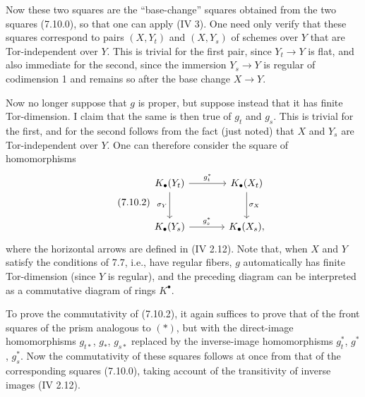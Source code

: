 %

Now these two squares are the ``base-change'' squares obtained from the two squares (7.10.0), so that one can apply (IV 3). One need only verify that these squares correspond to pairs \((X,Y_t)\) and \((X,Y_s)\) of schemes over \(Y\) that are Tor-independent over \(Y\). This is trivial for the first pair, since \(Y_t\to Y\) is flat, and also immediate for the second, since the immersion \(Y_s\to Y\) is regular of codimension 1 and remains so after the base change \(X\to Y\).

Now no longer suppose that \(g\) is proper, but suppose instead that it has finite Tor-dimension. I claim that the same is then true of \(g_t\) and \(g_s\). This is trivial for the first, and for the second follows from the fact (just noted) that \(X\) and \(Y_s\) are Tor-independent over \(Y\). One can therefore consider the square of homomorphisms
\begin{equation}\tag{7.10.2}
\begin{tikzcd}[column sep=large,row sep=large]
K_\bullet(Y_t) \arrow[r,"g_t^*"] \arrow[d,"\sigma_Y"'] &
K_\bullet(X_t) \arrow[d,"\sigma_X"]\\
K_\bullet(Y_s) \arrow[r,"g_s^*"] &
K_\bullet(X_s),
\end{tikzcd}
\end{equation}
where the horizontal arrows are defined in (IV 2.12). Note that, when \(X\) and \(Y\) satisfy the conditions of 7.7, i.e., have regular fibers, \(g\) automatically has finite Tor-dimension (since \(Y\) is regular), and the preceding diagram can be interpreted as a commutative diagram of rings \(K^\bullet\).

To prove the commutativity of (7.10.2), it again suffices to prove that of the front squares of the prism analogous to \((*)\), but with the direct-image homomorphisms \(g_{t*}\), \(g_*\), \(g_{s*}\) replaced by the inverse-image homomorphisms \(g_t^*\), \(g^*\), \(g_s^*\). Now the commutativity of these squares follows at 
%
once from that of the corresponding squares (7.10.0), taking account of the transitivity of inverse images (IV 2.12).

